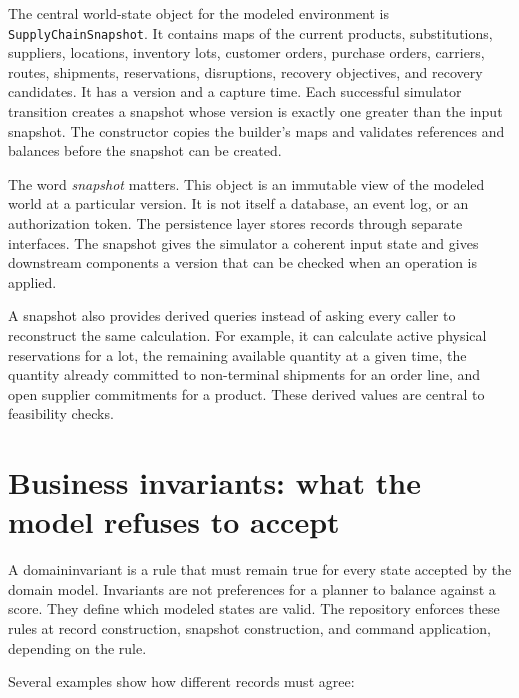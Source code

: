 The central world-state object for the modeled environment is \texttt{SupplyChainSnapshot}. It contains maps of the current products, substitutions, suppliers, locations, inventory lots, customer orders, purchase orders, carriers, routes, shipments, reservations, disruptions, recovery objectives, and recovery candidates. It has a version and a capture time. Each successful simulator transition creates a snapshot whose version is exactly one greater than the input snapshot. The constructor copies the builder's maps and validates references and balances before the snapshot can be created.

The word \emph{snapshot} matters. This object is an immutable view of the modeled world at a particular version. It is not itself a database, an event log, or an authorization token. The persistence layer stores records through separate interfaces. The snapshot gives the simulator a coherent input state and gives downstream components a version that can be checked when an operation is applied.

A snapshot also provides derived queries instead of asking every caller to reconstruct the same calculation. For example, it can calculate active physical reservations for a lot, the remaining available quantity at a given time, the quantity already committed to non-terminal shipments for an order line, and open supplier commitments for a product. These derived values are central to feasibility checks.

\section{Business invariants: what the model refuses to accept}
\label{sec:ch19-invariants}

A \gls{domaininvariant} is a rule that must remain true for every state accepted by the domain model. Invariants are not preferences for a planner to balance against a score. They define which modeled states are valid. The repository enforces these rules at record construction, snapshot construction, and command application, depending on the rule.

Several examples show how different records must agree:

